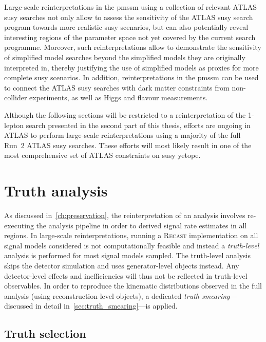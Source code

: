 Large-scale reinterpretations in the \gls{pmssm} using a collection of relevant ATLAS \gls{susy} searches not only allow to assess the sensitivity of the ATLAS \gls{susy} search program towards more realistic \gls{susy} scenarios, but can also potentially reveal interesting regions of the parameter space not yet covered by the current search programme. Moreover, such reinterpretations allow to demonstrate the sensitivity of simplified model searches beyond the simplified models they are originally interpreted in, thereby justifying the use of simplified models as proxies for more complete \gls{susy} scenarios. In addition, reinterpretations in the \gls{pmssm} can be used to connect the ATLAS \gls{susy} searches with dark matter constraints from non-collider experiments, as well as Higgs and flavour measurements.  

Although the following sections will be restricted to a reinterpretation of the 1-lepton search presented in the second part of this thesis, efforts are ongoing in ATLAS to perform large-scale reinterpretations using a majority of the full Run~2 ATLAS \gls{susy} searches. These efforts will most likely result in one of the most comprehensive set of ATLAS constraints on \gls{susy} yetope.

\section{Truth analysis}\label{sec:truth_analysis}

As discussed in~\cref{ch:preservation}, the reinterpretation of an analysis involves re-executing the analysis pipeline in order to derived signal rate estimates in all regions. In large-scale reinterpretations, running a \textsc{Recast} implementation on all signal models considered is not computationally feasible and instead a \textit{truth-level} analysis is performed for most signal models sampled. The truth-level analysis skips the detector simulation and uses generator-level objects instead. Any detector-level effects and inefficiencies will thus not be reflected in truth-level observables. In order to reproduce the kinematic distributions observed in the full analysis (using reconstruction-level objects), a dedicated \textit{truth smearing}---discussed in detail in~\cref{sec:truth_smearing}---is applied.

\subsection{Truth selection}\label{sec:truth_selection}

